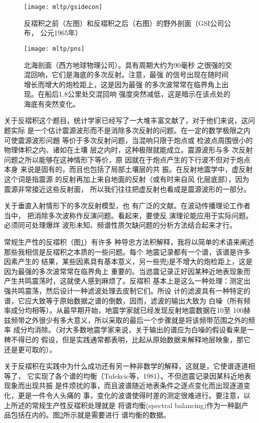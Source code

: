 \begin{figure}[H]
\centering
\texttt{[image: mltp/gsidecon]}
\caption[gsidecon]{
反褶积之前（左图）和反褶积之后（右图）的野外剖面（GSI公司公布，
公元1965年）
}
\label{fig:mltp/gsidecon}
\end{figure}

\begin{figure}[H]
\centering
\texttt{[image: mltp/pns]}
\caption[pns]{
北海剖面（西方地球物理公司）。具有周期大约为90毫秒
之很强的交混回响，它们是海底的多次反射。注意，最强
的信号出现在随时间增长而增大的炮检距上，这是因为最强
的多次波常常在临界角上出现。在船后1.8公里处交混回响
强度突然减低，这是暗示在该点处的海底有突然变化。
}
\label{fig:mltp/pns}
\end{figure}

关于反褶积这个题目，统计学家已经写了一大堆丰富文献了，对于他们来说，这问题实际
是一个估计震源波形而不是消除多次反射的问题。在一定的数学极限之内可使震源波形问題
等价于多次反射问题，当混响只限于炮点或
检波点周围很小的物理体积之内、诸如在土壤
层之内时，这种极限就能成立。震源波形与多
次反射问题之所以能够在这神情形下等价，原
因就在于炮点产生的下行波不但对于炮点本身
来说是固有的，而且也包括了局部土壤层的共
振。在反射地震学中，虚反射这个词是指震源
的反射再加上来自地面的反射（或有时来自风
化层底部），因为震源非常接近这些反射面，
所以我们往往把虚反射也看成是震源波形的一部分。

关于垂直入射情形下的多次反射模型，也
有广泛的文献。在波动传播理论工作者当中，
把消除多次波称作反演问题。看起来，要使反
演理论能应用于实际问题。必须同可处理爆烊
波形未知、频谱性质欠缺问题的分析方法结合起来才行。

常规生产性的反褶积（图\ref{fig:mltp/gsidecon}）有许多
种导忠方法积解释，我将以简单的术语来阐述
那些我相信是反褶积之本质的一些问题。每个
地震记录都有一个谱，该谱是许多因素产生的
结果，某些因素具有基本意义，另一些兜j是不增大的炮检距上，这是因为最强的多次波常常在临界角上
重要的。当迆震记录正好因某种近地表现象而
产生共鸣震荡时，这就使人感到麻烦了。反褶积
基本上是这么一种处理：测定出强共鸣震荡，然后设计一种滤波处理去皮制它们。所设
计的滤波具有一种特定的谱，它应大致等于原始数据之谱的倒数，因而，滤波的输出大致为
白噪（所有频率成分均相等）。从最早期开始，地震学家就已经发现反射地震数据在10至
100赫兹频带之外很少有多大意义，所以采取的最后一个步骤就是将该频带范围之外的频率
成分均消除。（对大多数地震学家来说，关于输出的谱应为白噪的假设看来是一稗不得已的
假设，但是实践通常都表明，比起从原始数据来解释地层映象，那它还是更可取的）。

关于反褶积在实践中为什么成功还有另一种非数学的解释，这就是，它使谱逐道相等了，
它实现了各个谱的均衡（Tufekcic等，1981）。不但迆震记录因某科近地表现象而出现共振
是件烦扰的事，而且波谱随近地表条件之逐点变化而出现逐道变化，更是一件令人头痛的
事，变化的波谱使得时差的测定很难进行。要注意，以上所述的常规生产性反褶积处理就是
将谱均衡(spectral balancing)作为一种副产品包括在内的。图\ref{fig:mltp/pns}所示就是需要进行
谱均衡的数据。

